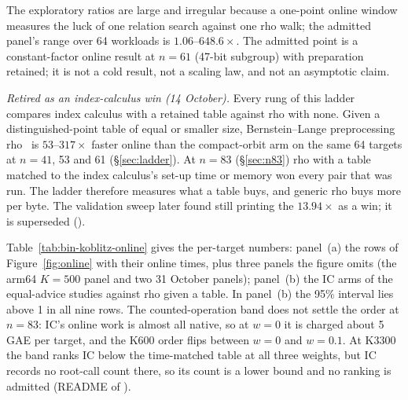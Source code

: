 The exploratory ratios are large and irregular because a one-point online
window measures the luck of one relation search against one rho walk; the
admitted panel's range over 64 workloads is $1.06$--$648.6\times$. The
admitted point is a constant-factor online result at $n=61$ (47-bit
subgroup) with preparation retained; it is not a cold result, not a
scaling law, and not an asymptotic claim.

\emph{Retired as an index-calculus win (14 October).} Every rung of this
ladder compares index calculus with a retained table against rho with
none. Given a distinguished-point table of equal or smaller size,
Bernstein--Lange preprocessing rho~\cite{bl2012} is $53$--$317\times$
faster online than the compact-orbit arm on the same 64 targets at $n=41$,
53 and 61 (\S\ref{sec:ladder}). At $n=83$ (\S\ref{sec:n83}) rho with a
table matched to the index calculus's set-up time or memory won every pair
that was run. The ladder therefore measures what a table buys, and generic
rho buys more per byte. The validation sweep later found
 still printing the $13.94\times$ as a
win; it is superseded
().

Table~\ref{tab:bin-koblitz-online} gives the per-target numbers: panel~(a)
the rows of Figure~\ref{fig:online} with their online times, plus three
panels the figure omits (the arm64 $K=500$ panel and two 31 October
panels); panel~(b) the IC arms of the equal-advice studies against rho
given a table. In panel~(b) the 95\% interval lies
above 1 in all nine rows. The counted-operation band does not settle the
order at $n=83$: IC's online work is almost all native, so at $w=0$ it is
charged about 5\,GAE per target, and the K600 order flips between $w=0$ and
$w=0.1$. At K3300 the band ranks IC below the time-matched table at all
three weights, but IC records no root-call count there, so its count is a
lower bound and no ranking is admitted (README of
).

